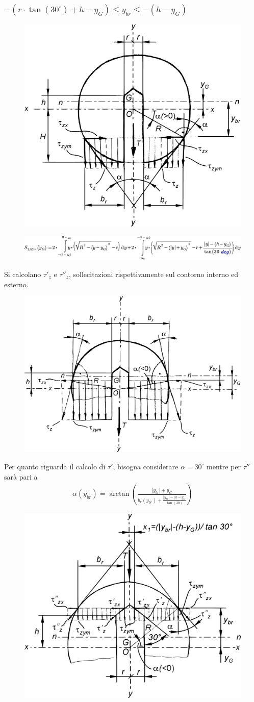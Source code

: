\subsubsection{$-(r \cdot \tan(30^\circ)+h-y_G) \leq y_{br} \leq -(h-y_G)$}
\begin{figure}[H]
\centering
  \includegraphics[width=.45\textwidth]{imgs/Cap7/SezAsse9}
\caption{}
\label{fig:SezAsse9}
\end{figure}
\begin{figure}[H]
\centering
  \includegraphics[width=.75\textwidth]{imgs/MathAsse5_0}
\caption{}
\label{fig:MathAsse5_0}
\end{figure}
Si calcolano $\tau'_z$ e $\tau''_z$, sollecitazioni rispettivamente sul contorno interno ed esterno.
\begin{figure}[H]
\centering
  \includegraphics[width=.4\textwidth]{imgs/Cap7/SezAsse10}
\caption{}
\label{fig:SezAsse10}
\end{figure}
Per quanto riguarda il calcolo di $\tau'$, bisogna considerare $\alpha=30^\circ$ mentre per $\tau''$ sarà pari a 
\begin{align*}
\alpha(y_{br}) = \arctan \left( \frac{|y_{br}|+y_G}{b_r(y_{br})+\frac{|y_{br}|-(h-y_G}{\tan(30)}} \right)
\end{align*}
\begin{figure}[H]
\centering
  \includegraphics[width=.45\textwidth]{imgs/Cap7/SezAsse11}
\caption{}
\label{fig:SezAsse11}
\end{figure}
